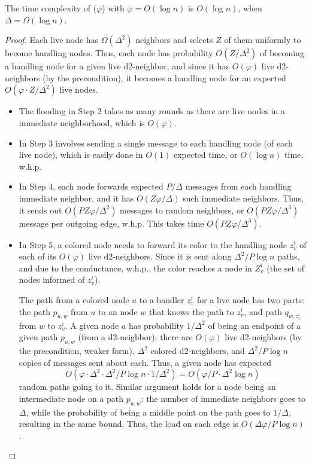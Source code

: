 \begin{theorem}
The time complexity of ($\varphi$) with $\varphi=O(\log n)$ is $O(\log n)$, when $\Delta = \Omega(\log n)$.
\label{T:learnpalette}
\end{theorem}
%
\begin{proof}
Each live node has $\Omega(\Delta^2)$ neighbors and selects $Z$ of them uniformly to become handling nodes. Thus, each node has probability $O(Z/\Delta^2)$ of becoming a handling node for a given live d2-neighbor, and since it has $O(\varphi)$ live d2-neighbors (by the precondition), it becomes a handling node for an expected $O(\varphi \cdot Z/\Delta^2)$ live nodes. 
\begin{itemize}
\item The flooding in Step 2 takes as many rounds as there are live nodes in a immediate neighborhood, which is $O(\varphi)$.
\item In Step 3 involves sending a single message to each handling node (of each live node), which is easily done in $O(1)$ expected time, or $O(\log n)$ time, w.h.p.
\item In Step 4, each node forwards expected $P/\Delta$ messages from each handling immediate neighbor, and it has $O(Z\varphi/\Delta)$ such immediate neighbors. 
Thus, it sends out $O(P Z\varphi/\Delta^2)$ messages to random neighbors, or $O(P Z \varphi/\Delta^3)$ message per outgoing edge, w.h.p. This takes time $O(PZ \varphi/\Delta^3)$. 
\item In Step 5, a colored node needs to forward its color to the handling node $z_v^i$ of each of its $O(\varphi)$ live d2-neighbors. Since it is sent along $\Delta^2/P \log n$ paths, and due to the conductance,  w.h.p., the color reaches a node in $Z_v^i$ (the set of nodes informed of $z_v^i$). 

The path from a colored node $u$ to a handler $z_v^i$ for a live node has two parts: the path $p_{u,w}$ from $u$ to an node $w$ that knows the path to $z_v^i$, and path $q_{w,z_v^i}$ from $w$ to $z_v^i$. 
A given node $a$ has probability $1/\Delta^2$ of being an endpoint of a given path $p_{u,w}$ (from a d2-neighbor); there are $O(\varphi)$ live d2-neighbors (by the precondition, weaker form), $\Delta^2$ colored d2-neighbors, and $\Delta^2/P \log n$ copies of messages sent about each. Thus, a given node has expected 
\[ O(\varphi \cdot \Delta^2 \cdot \Delta^2/P \log n \cdot 1/\Delta^2) = O(\varphi/P \cdot \Delta^2 \log n) \] 
random paths going to it.
Similar argument holds for a node being an intermediate node on a path $p_{u,w}$: the number of immediate neighbors goes to $\Delta$, while the probability of being a middle point on the path goes to $1/\Delta$, resulting in the same bound.
Thus, the load on each edge is $O(\Delta \varphi/P \log n)$. 


\end{itemize}
\end{proof}
